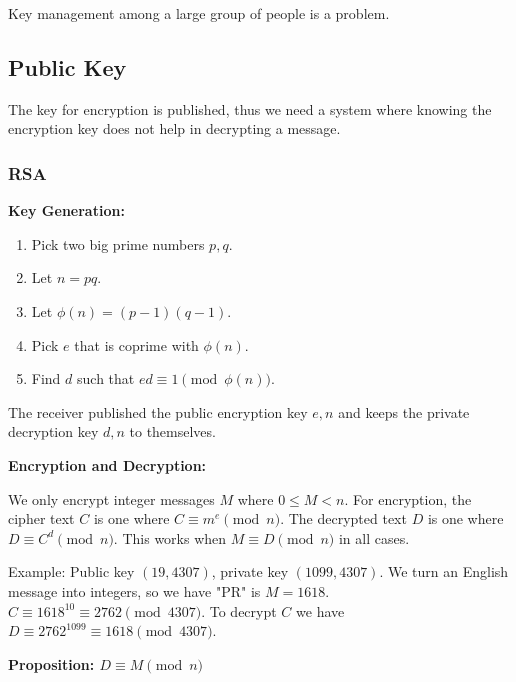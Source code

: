 \documentclass[12pt]{article}
\newcommand{\proposition}[1]{{\bf Proposition: \textit{#1}}}
\begin{document}
Key management among a large group of people is a problem.

\subsection*{Public Key}
The key for encryption is published, thus we need a system where knowing the encryption key does not help in decrypting a message.

\subsubsection*{RSA}
{\bf Key Generation:}
\begin{enumerate}
\item Pick two big prime numbers $p, q$.
\item Let $n = pq$.
\item Let $\phi(n) = (p-1)(q-1)$.
\item Pick $e$ that is coprime with $\phi(n)$.
\item Find $d$ such that $ed \equiv 1 \pmod{\phi(n)}$.
\end{enumerate}

The receiver published the public encryption key $e, n$ and keeps the private decryption key $d, n$ to themselves.

{\bf Encryption and Decryption:}

We only encrypt integer messages $M$ where $0 \leq M < n$. For encryption, the cipher text $C$ is one where $C \equiv m^e \pmod{n}$. The decrypted text $D$ is one where $D \equiv C^d \pmod{n}$. This works when $M \equiv D \pmod n$ in all cases.

Example: Public key $(19, 4307)$, private key $(1099, 4307)$. We turn an English message into integers, so we have "PR" is $M = 1618$. $C \equiv 1618^{10} \equiv 2762 \pmod{4307}$. To decrypt $C$ we have $D \equiv 2762^{1099} \equiv 1618 \pmod{4307}$.

\proposition{$D \equiv M \pmod n$}

\end{document}
